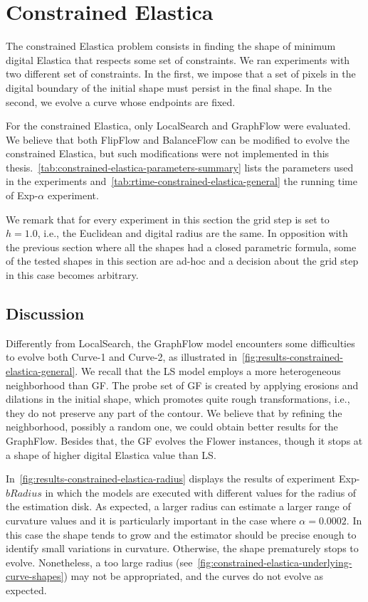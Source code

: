 \section{Constrained Elastica}

The constrained Elastica problem consists in finding the shape of minimum digital Elastica that respects some set of constraints. We ran experiments with two different set of constraints. In the first, we impose that a set of pixels in the digital boundary of the initial shape must persist in the final shape. In the second, we evolve a curve whose endpoints are fixed. 

For the constrained Elastica, only LocalSearch and GraphFlow were evaluated. We believe that both FlipFlow and BalanceFlow can be modified to evolve the constrained Elastica, but such modifications were not implemented in this thesis.~\cref{tab:constrained-elastica-parameters-summary} lists the parameters used in the experiments and~\cref{tab:rtime-constrained-elastica-general} the running time of Exp-$\alpha$ experiment.

We remark that for every experiment in this section the grid step is set to $h=1.0$, i.e., the Euclidean and digital radius are the same. In opposition with the previous section where all the shapes had a closed parametric formula, some of the tested shapes in this section are ad-hoc and a decision about the grid step in this case becomes arbitrary.

\subsection{Discussion}

Differently from LocalSearch, the GraphFlow model encounters some difficulties to evolve both Curve-1 and Curve-2, as illustrated in~\cref{fig:results-constrained-elastica-general}. We recall that the LS model employs a more heterogeneous neighborhood than GF. The probe set of GF is created by applying erosions and dilations in the initial shape, which promotes quite rough transformations, i.e., they do not preserve any part of the contour. We believe that by refining the neighborhood, possibly a random one, we could obtain better results for the GraphFlow. Besides that, the GF evolves the Flower instances, though it stops at a shape of higher digital Elastica value than LS.

In~\cref{fig:results-constrained-elastica-radius} displays the results of experiment Exp-$bRadius$ in which the models are executed with different values for the radius of the estimation disk. As expected, a larger radius can estimate a larger range of curvature values and it is particularly important in the case where $\alpha=0.0002$. In this case the shape tends to grow and the estimator should be precise enough to identify small variations in curvature. Otherwise, the shape prematurely stops to evolve. Nonetheless, a too large radius (see~\cref{fig:constrained-elastica-underlying-curve-shapes}) may not be appropriated, and the curves do not evolve as expected.


